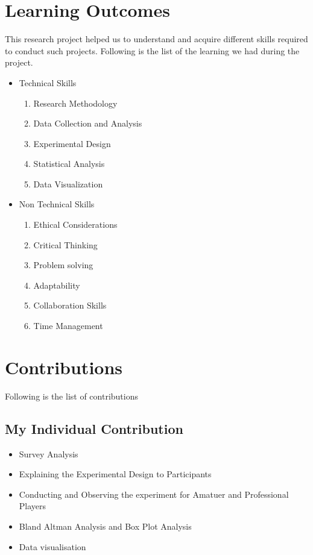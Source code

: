 \documentclass[conference]{IEEEtran}
\begin{document}
\section{Learning Outcomes}
This research project helped us to understand and acquire different skills required to conduct such projects. Following is the list of the learning we had during the project.
\begin{itemize}
  \item Technical Skills
  \begin{enumerate}
      \item Research Methodology
      \item Data Collection and Analysis
      \item Experimental Design
      \item Statistical Analysis
      \item Data Visualization
  \end{enumerate}
  \item Non Technical Skills
  \begin{enumerate}
      \item Ethical Considerations
      \item Critical Thinking
      \item Problem solving
      \item Adaptability
      \item Collaboration Skills
      \item Time Management
  \end{enumerate}
\end{itemize}
\section{Contributions}
Following is the list of contributions

\subsection{My Individual Contribution}
\begin{itemize}
    \item Survey Analysis
    \item Explaining the Experimental Design to Participants
    \item Conducting and Observing the experiment for Amatuer and Professional Players
    \item Bland Altman Analysis and Box Plot Analysis
    \item Data visualisation
    
\end{itemize}
\end{document}
